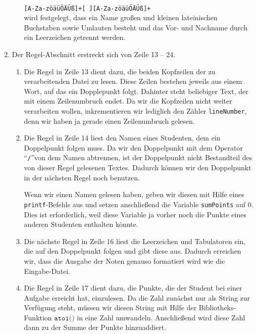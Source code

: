 \begin{enumerate}
\begin{enumerate}
            \\[0.2cm]
            \hspace*{1.3cm}
            \texttt{[A-Za-z\"o\"a\"u\"O\"A\"U{\ss}]+[ ][A-Za-z\"o\"a\"u\"O\"A\"U{\ss}]+}
            \\[0.2cm]
            wird festgelegt, dass ein Name gro{\ss}en und kleinen lateinischen
            Buchstaben sowie Umlauten besteht und das Vor- und Nachname durch ein
            Leerzeichen getrennt werden.
      \end{enumerate}
\item Der Regel-Abschnitt erstreckt sich von Zeile 13 -- 24.
      \begin{enumerate}
      \item Die Regel in Zeile 13 dient dazu, die beiden Kopfzeilen
            der zu verarbeitenden Datei zu lesen.  Diese Zeilen bestehen jeweils aus einem Wort,
            auf das ein Dopplepunkt folgt.  Dahinter steht beliebiger Text, der mit einem
            Zeilenumbruch endet.  Da wir die Kopfzeilen nicht weiter verarbeiten wollen,
            inkrementieren wir lediglich den Z\"ahler \texttt{lineNumber}, denn wir haben ja gerade
            einen Zeilenumbruch gelesen.
      \item Die Regel in Zeile 14 liest den Namen eines Studenten, dem ein Doppelpunkt
            folgen muss.  Da wir den Doppelpunkt mit dem Operator ``\texttt{/}''von dem Namen
            abtrennen, ist der Doppelpunkt nicht Bestandteil des von dieser Regel gelesenen Textes.
            Dadurch k\"onnen wir den Doppelpunkt in der n\"achsten Regel noch benutzen.

            Wenn wir einen Namen gelesen haben, geben wir diesen mit Hilfe eines
            \texttt{printf}-Befehls aus und setzen anschlie{\ss}end die Variable \texttt{sumPoints}
            auf 0.  Dies ist erforderlich, weil diese Variable ja vorher noch die Punkte eines
            anderen Studenten enthalten k\"onnte.
      \item Die n\"achste Regel in Zeile 16 liest die Leerzeichen und Tabulatoren ein, die auf 
            den Doppelpunkt folgen und gibt diese aus.  Dadurch erreichen wir, dass die Ausgabe
            der Noten genauso formatiert wird wie die Eingabe-Datei.
      \item Die Regel in Zeile 17 dient dazu, die Punkte, die der Student bei einer Aufgabe 
            erreicht hat, einzulesen.  Da die Zahl zun\"achst nur als String zur Verf\"ugung steht,
            m\"ussen wir diesen String mit Hilfe der Bibliotheks-Funktion $\texttt{atoi()}$ in eine Zahl
            umwandeln.  Anschlie{\ss}end wird diese Zahl dann zu der Summe der Punkte hinzuaddiert.


\end{enumerate}
\end{enumerate}
